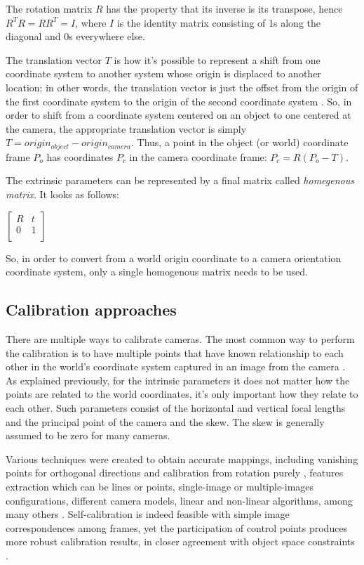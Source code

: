 \documentclass[msc, a4paper, classic, en]{ufbathesis}
\begin{document}
The rotation matrix $R$ has the property that its inverse is its transpose, hence $R^TR = RR^T = I$, where $I$ is the identity matrix consisting of 1s along the diagonal and 0s everywhere else.

The translation vector $T$ is how it's possible to represent a shift from one coordinate system to another system whose origin is displaced to another location; in other words, the translation vector is just the offset from the origin of the first coordinate system to the origin of the second coordinate system \cite{bradski2008learning}. So, in order to shift from a coordinate system centered on an object to one centered at the camera, the appropriate translation vector is simply $T = origin_{object} - origin_{camera}$. Thus, a point in the object (or world) coordinate frame $P_o$ has coordinates $P_c$ in the camera coordinate frame: $P_c = R(P_o - T)$.

The extrinsic parameters can be represented by a final matrix called \textit{homegenous matrix}. It looks as follows:

\begin{center}
$\begin{bmatrix}
R & t \\
0 & 1 \\
\end{bmatrix}$
\end{center}

So, in order to convert from a world origin coordinate to a camera orientation coordinate system, only a single homogenous matrix needs to be used.

\subsection{Calibration approaches}

There are multiple ways to calibrate cameras. The most common way to perform the calibration is to have multiple points that have known relationship to each other in the world's coordinate system captured in an image from the camera \cite{tillapaugh2008indirect}. As explained previously, for the intrinsic parameters it does not matter how the points are related to the world coordinates, it's only important how they relate to each other. Such parameters consist of the horizontal and vertical focal lengths and the principal point of the camera and the skew. The skew is generally assumed to be zero \cite{furht2011handbook} for many cameras.

Various techniques were created to obtain accurate mappings, including vanishing points for orthogonal directions and calibration from rotation purely \cite{Medioni:2004:ETC:993884}, features extraction which can be lines or points, single-image or multiple-images configurations, different camera models, linear and non-linear algorithms, among many others \cite{Armangue00acomparative} \cite{clarke98}. Self-calibration is indeed feasible with simple image correspondences among frames, yet the participation of control points produces more robust calibration results, in closer agreement with object space constraints \cite{Douskos_automaticcalibration}.
\end{document}
